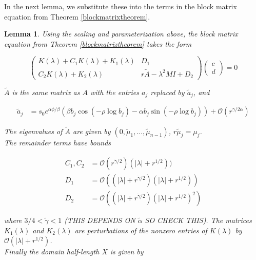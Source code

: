 \documentclass[12pt]{article}
\newtheorem{lemma}{Lemma}
\begin{document}
In the next lemma, we substitute these into the terms in the block matrix equation from Theorem \ref{blockmatrixtheorem}.


\begin{lemma}\label{reparam}
Using the scaling and parameterization above, the block matrix equation from Theorem \ref{blockmatrixtheorem} takes the form

\begin{equation}\label{blockeq}
\begin{pmatrix}
K(\lambda) + C_1 K(\lambda) + K_1(\lambda) & D_1 \\
C_2 K(\lambda) + K_2(\lambda) & r \tilde{A} - \lambda^2 MI + D_2
\end{pmatrix}
\begin{pmatrix}c \\ d \end{pmatrix} 
= 0
\end{equation}

$\tilde{A}$ is the same matrix as $A$ with the entries $a_j$ replaced by $\tilde{a}_j$, and 

\begin{align}\label{tildea}
\tilde{a}_j 
&= s_0 e^{\alpha \phi/\beta} \left( \beta b_j \cos\left( -\rho \log b_j \right) - \alpha b_j \sin \left( -\rho \log b_j  \right) \right) + \mathcal{O}(r^{\gamma/2\alpha})
\end{align}

The eigenvalues of $\tilde{A}$ are given by $(0, \tilde{\mu}_1, \dots, \tilde{\mu}_{n-1})$, $r \tilde{\mu}_j = \mu_j$.\\

The remainder terms have bounds

\begin{align*}
C_1, C_2 &= \mathcal{O}(r^{\tilde{\gamma}/2})(|\lambda| + r^{1/2})) \\
D_1 &= \mathcal{O}((|\lambda| + r^{\tilde{\gamma}/2})(|\lambda| + r^{1/2})) \\
D_2 &= \mathcal{O}((|\lambda| + r^{\tilde{\gamma}/2})(|\lambda| + r^{1/2})^2)
\end{align*}

where $3/4 < \tilde{\gamma} < 1$ (THIS DEPENDS ON $\tilde{\alpha}$ SO CHECK THIS). The matrices $K_1(\lambda)$ and $K_2(\lambda)$ are perturbations of the nonzero entries of $K(\lambda)$ by $\mathcal{O}(|\lambda| + r^{1/2})$.\\

Finally the domain half-length $X$ is given by


\end{lemma}
\end{document}
